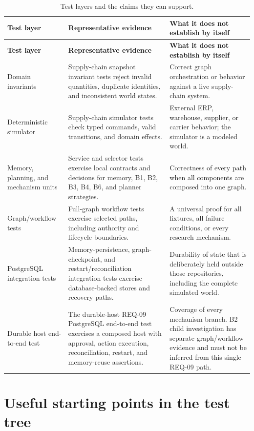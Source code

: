 \begin{longtable}{P{0.20\textwidth} P{0.36\textwidth} P{0.34\textwidth}}
\caption{Test layers and the claims they can support.}\label{tab:appendix-d-test-layers}\\
\toprule
\textbf{Test layer} & \textbf{Representative evidence} & \textbf{What it does not establish by itself} \\
\midrule
\endfirsthead
\toprule
\textbf{Test layer} & \textbf{Representative evidence} & \textbf{What it does not establish by itself} \\
\midrule
\endhead
Domain invariants & Supply-chain snapshot invariant tests reject invalid quantities, duplicate identities, and inconsistent world states. & Correct graph orchestration or behavior against a live supply-chain system. \\
Deterministic simulator & Supply-chain simulator tests check typed commands, valid transitions, and domain effects. & External ERP, warehouse, supplier, or carrier behavior; the simulator is a modeled world. \\
Memory, planning, and mechanism units & Service and selector tests exercise local contracts and decisions for memory, B1, B2, B3, B4, B6, and planner strategies. & Correctness of every path when all components are composed into one graph. \\
Graph/workflow tests & Full-graph workflow tests exercise selected paths, including authority and lifecycle boundaries. & A universal proof for all fixtures, all failure conditions, or every research mechanism. \\
PostgreSQL integration tests & Memory-persistence, graph-checkpoint, and restart/reconciliation integration tests exercise database-backed stores and recovery paths. & Durability of state that is deliberately held outside those repositories, including the complete simulated world. \\
Durable host end-to-end test & The durable-host REQ-09 PostgreSQL end-to-end test exercises a composed host with approval, action execution, reconciliation, restart, and memory-reuse assertions. & Coverage of every mechanism branch. B2 child investigation has separate graph/workflow evidence and must not be inferred from this single REQ-09 path. \\
\bottomrule
\end{longtable}

\section{Useful starting points in the test tree}

